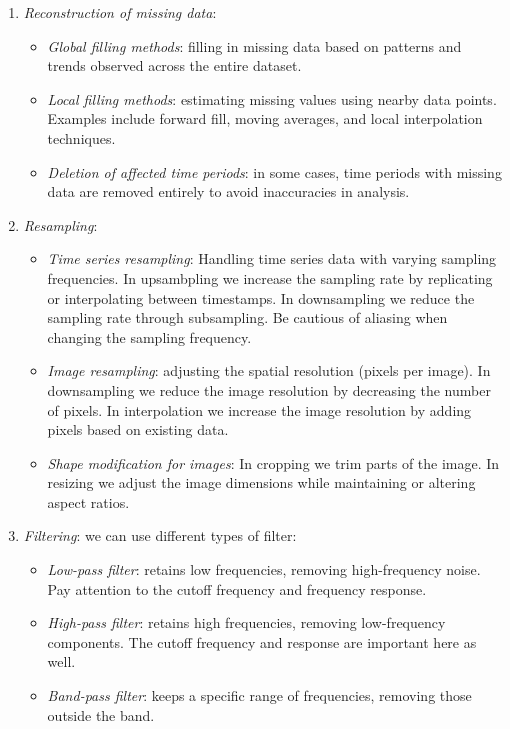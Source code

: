 \begin{enumerate}
    \item \textit{Reconstruction of missing data}:
        \begin{itemize}
            \item \textit{Global filling methods}: filling in missing data based on patterns and trends observed across the entire dataset.
            \item \textit{Local filling methods}: estimating missing values using nearby data points. Examples include forward fill, moving averages, and local interpolation techniques.
            \item \textit{Deletion of affected time periods}: in some cases, time periods with missing data are removed entirely to avoid inaccuracies in analysis.
        \end{itemize}
    \item \textit{Resampling}:
        \begin{itemize}
            \item \textit{Time series resampling}: Handling time series data with varying sampling frequencies.
                In upsambpling we increase the sampling rate by replicating or interpolating between timestamps.
                In downsampling we reduce the sampling rate through subsampling.
                Be cautious of aliasing when changing the sampling frequency.
            \item \textit{Image resampling}: adjusting the spatial resolution (pixels per image).
                In downsampling we reduce the image resolution by decreasing the number of pixels.
                In interpolation we increase the image resolution by adding pixels based on existing data.
            \item \textit{Shape modification for images}:
                In cropping we trim parts of the image.
                In resizing we adjust the image dimensions while maintaining or altering aspect ratios.
        \end{itemize}
    \item \textit{Filtering}: we can use different types of filter: 
        \begin{itemize}
            \item \textit{Low-pass filter}: retains low frequencies, removing high-frequency noise. Pay attention to the cutoff frequency and frequency response.
            \item \textit{High-pass filter}: retains high frequencies, removing low-frequency components. The cutoff frequency and response are important here as well.
            \item \textit{Band-pass filter}: keeps a specific range of frequencies, removing those outside the band.
        \end{itemize}
\end{enumerate}

